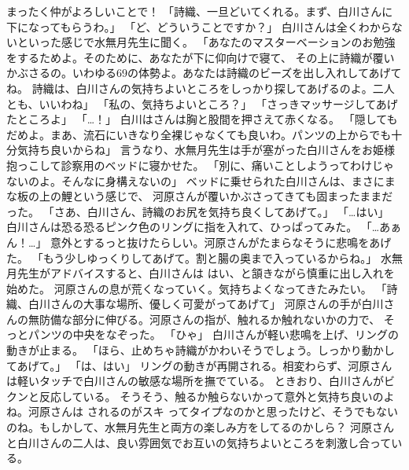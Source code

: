 まったく仲がよろしいことで！
「詩織、一旦どいてくれる。まず、白川さんに下になってもらうわ。」
「ど、どういうことですか？」
白川さんは全くわからないといった感じで水無月先生に聞く。
「あなたのマスターベーションのお勉強をするためよ。そのために、あなたが下に仰向けで寝て、
その上に詩織が覆いかぶさるの。いわゆる69の体勢よ。あなたは詩織のビーズを出し入れしてあげてね。
詩織は、白川さんの気持ちよいところをしっかり探してあげるのよ。二人とも、いいわね」
「私の、気持ちよいところ？」
「さっきマッサージしてあげたところよ」
「…！」
白川はさんは胸と股間を押さえて赤くなる。
「隠してもだめよ。まあ、流石にいきなり全裸じゃなくても良いわ。パンツの上からでも十分気持ち良いからね」
言うなり、水無月先生は手が塞がった白川さんをお姫様抱っこして診察用のベッドに寝かせた。
「別に、痛いことしようってわけじゃないのよ。そんなに身構えないの」
ベッドに乗せられた白川さんは、まさにまな板の上の鯉という感じで、
河原さんが覆いかぶさってきても固まったままだった。
「さあ、白川さん、詩織のお尻を気持ち良くしてあげて。」
「…はい」
白川さんは恐る恐るピンク色のリングに指を入れて、ひっぱってみた。
「…あぁん！…」
意外とするっと抜けたらしい。河原さんがたまらなそうに悲鳴をあげた。
「もう少しゆっくりしてあげて。割と腸の奥まで入っているからね。」
水無月先生がアドバイスすると、白川さんは はい、と頷きながら慎重に出し入れを始めた。
河原さんの息が荒くなっていく。気持ちよくなってきたみたい。
「詩織、白川さんの大事な場所、優しく可愛がってあげて」
河原さんの手が白川さんの無防備な部分に伸びる。河原さんの指が、触れるか触れないかの力で、
そっとパンツの中央をなぞった。
「ひゃ」
白川さんが軽い悲鳴を上げ、リングの動きが止まる。
「ほら、止めちゃ詩織がかわいそうでしょう。しっかり動かしてあげて。」
「は、はい」
リングの動きが再開される。相変わらず、河原さんは軽いタッチで白川さんの敏感な場所を撫でている。
ときおり、白川さんがビクンと反応している。
そうそう、触るか触らないかって意外と気持ち良いのよね。河原さんは されるのがスキ ってタイプなのかと思ったけど、そうでもないのね。もしかして、水無月先生と両方の楽しみ方をしてるのかしら？
河原さんと白川さんの二人は、良い雰囲気でお互いの気持ちよいところを刺激し合っている。

